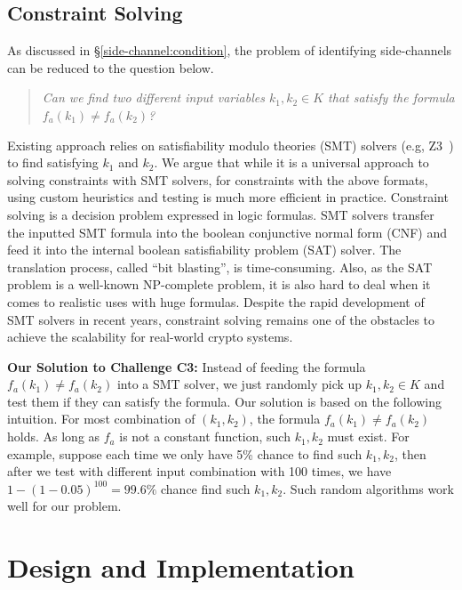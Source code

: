 \subsection{Constraint Solving}
As discussed in \S\ref{side-channel:condition}, the problem of identifying
side-channels can be reduced to the question below.

\begin{quote}
      \textit{Can we find two different input variables $k_1, k_2 \in K$ that
            satisfy the formula $f_a(k_1) \neq f_a(k_2)$?}
\end{quote}

Existing approach relies on satisfiability modulo theories (SMT) solvers (e.g,
Z3~\cite{DeMoura:2008:ZES:1792734.1792766}) to find satisfying $k_1$ and $k_2$.
We argue that while it is a universal approach to solving constraints with SMT
solvers, for constraints with the above formats, using custom heuristics and
testing is much more efficient in practice. Constraint solving is a decision
problem expressed in logic formulas. SMT solvers transfer the inputted SMT
formula into the boolean conjunctive normal form (CNF) and feed it into the
internal boolean satisfiability problem (SAT) solver. The translation process,
called ``bit blasting'', is time-consuming. Also, as the SAT problem is a
well-known NP-complete problem, it is also hard to deal when it comes to
realistic uses with huge formulas. Despite the rapid development of SMT solvers
in recent years, constraint solving remains one of the obstacles to achieve the
scalability for real-world crypto systems.

\vspace*{2pt}
\textbf{Our Solution to Challenge C3:}
Instead of feeding the formula $f_a(k_1) \neq f_a(k_2)$ into a SMT solver, we
just randomly pick up $k_1, k_2 \in K$ and test them if they can satisfy the
formula. Our solution is based on the following intuition. For most combination
of $(k_{1}, k_{2} )$, the formula $f_a(k_1) \neq f_a(k_2)$ holds. As long as
$f_a$ is not a constant function, such $k_1, k_2$ must exist. For example,
suppose each time we only have 5\% chance to find such $k_1, k_2$, then after we
test with different input combination with 100 times, we have $1 -
(1-0.05)^{100} = 99.6\%$ chance find such $k_1, k_2$. Such random algorithms
work well for our problem.

\section{Design and Implementation}
